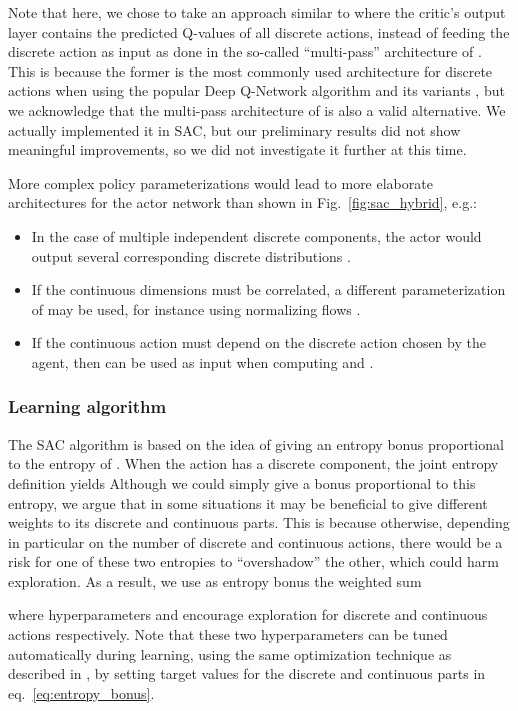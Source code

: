 \documentclass[letterpaper]{article} \usepackage{aaai20}  \usepackage{times}  \usepackage{helvet} \usepackage{courier}  \usepackage[hyphens]{url}  \usepackage{graphicx} \urlstyle{rm} \def\UrlFont{\rm}  \usepackage{graphicx}  \usepackage[section]{placeins}
\newcommand{\citet}{\cite}  \newcommand{\citep}{\cite} \DeclareMathOperator*{\softmax}{softmax}
\begin{document}
Note that here, we chose to take an approach similar to \citet{xiong2018} where the critic's output layer contains the predicted Q-values of all discrete actions, instead of feeding the discrete action as input as done in the so-called ``multi-pass'' architecture of \citet{bester2019}.
This is because the former is the most commonly used architecture for discrete actions when using the popular Deep Q-Network algorithm and its variants \citep{mnih2015human,hessel2017}, but we acknowledge that the multi-pass architecture of \citet{bester2019} is also a valid alternative.
We actually implemented it in SAC, but our preliminary results did not show meaningful improvements, so we did not investigate it further at this time.

More complex policy parameterizations would lead to more elaborate architectures for the actor network than shown in Fig.~\ref{fig:sac_hybrid}, e.g.:
\begin{itemize}
\item In the case of multiple independent discrete components, the actor would output several corresponding discrete distributions .
\item If the continuous dimensions must be correlated, a different parameterization of  may be used, for instance using normalizing flows \citep{mazoure2019leveraging}.
\item If the continuous action  must depend on the discrete action chosen by the agent, then  can be used as input when computing  and  \citep{wei2018}.
\end{itemize}

\subsubsection{Learning algorithm}

The SAC algorithm \citep{haarnoja2018soft} is based on the idea of giving an entropy bonus proportional to the entropy of .
When the action has a discrete component,
the joint entropy definition yields 
Although we could simply give a bonus proportional to this entropy, we argue that in some situations it may be beneficial to give different weights to its discrete and continuous parts.
This is because otherwise, depending in particular on the number of discrete and continuous actions, there would be a risk for one of these two entropies to ``overshadow'' the other, which could harm exploration.
As a result, we use as entropy bonus the weighted sum

where hyperparameters  and  encourage exploration for discrete and continuous actions respectively.
Note that these two hyperparameters can be tuned automatically during learning, using the same optimization technique as described in \citet{haarnoja2018softapplications}, by setting target values for the discrete and continuous parts in eq.~\ref{eq:entropy_bonus}.
\end{document}
